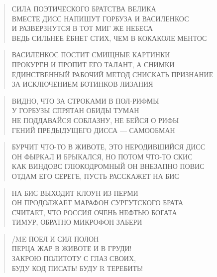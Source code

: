 \poemtitle{***}
\begin{verse}
СИЛА ПОЭТИЧЕСКОГО БРАТСТВА ВЕЛИКА\\
ВМЕСТЕ ДИСС НАПИШУТ ГОРБУЗА И ВАСИЛЕНКОС \\
И РАЗВЕРЗНУТСЯ В ТОТ МИГ ЖЕ НЕБЕСА\\
ВЕДЬ СИЛЬНЕЕ ЁБНЕТ СТИХ, ЧЕМ В КОКАКОЛЕ МЕНТОС
\end{verse}

\poemtitle{***}
\begin{verse}
ВАСИЛЕНКОС ПОСТИТ СМИЩНЫЕ КАРТИНКИ\\
ПРОКУРЕН И ПРОПИТ ЕГО ТАЛАНТ, А СНИМКИ\\
ЕДИНСТВЕННЫЙ РАБОЧИЙ МЕТОД СНИСКАТЬ ПРИЗНАНИЕ\\
ЗА ИСКЛЮЧЕНИЕМ БОТИНКОВ ЛИЗАНИЯ
\end{verse}

\poemtitle{***}
\begin{verse}
ВИДНО, ЧТО ЗА СТРОКАМИ В ПОЛ-РИФМЫ\\
У ГОРБУЗЫ СПРЯТАН ОБИДЫ ТУМАН\\
НЕ ПОДДАВАЙСЯ СОБЛАЗНУ, НЕ БЕЙСЯ О РИФЫ\\
ГЕНИЙ ПРЕДЫДУЩЕГО ДИССА — САМООБМАН
\end{verse}

\poemtitle{***}
\begin{verse}
БУРЧИТ ЧТО-ТО В ЖИВОТЕ, ЭТО НЕРОДИВШИЙСЯ ДИСС\\
ОН ФЫРКАЛ И БРЫКАЛСЯ, НО ПОТОМ ЧТО-ТО СКИС\\
КАК ВИНДОВС ГЛЮКОДРОМНЫЙ ОН ВНЕЗАПНО ПОВИС\\
ОТДАМ ЕГО СЕРЕГЕ, ПУСТЬ РАССКАЖЕТ НА БИС
\end{verse}

\poemtitle{***}
\begin{verse}
НА БИС ВЫХОДИТ КЛОУН ИЗ ПЕРМИ\\
ОН ПРОДОЛЖАЕТ МАРАФОН СУРГУТСКОГО БРАТА\\
СЧИТАЕТ, ЧТО РОССИЯ ОЧЕНЬ НЕФТЬЮ БОГАТА\\
ТИМУР, ОБРАТНО МИКРОФОН ЗАБЕРИ
\end{verse}

\poemtitle{***}
\begin{verse}
/ME ПОЕЛ И СИЛ ПОЛОН\\
ПЕРЦА ЖАР В ЖИВОТЕ И В ГРУДИ!\\
ЗАКРОЮ ПОЛИТОТУ С ГЛАЗ СВОИХ,\\
БУДУ КОД ПИСАТЬ! БУДУ R ТЕРЕБИТЬ!
\end{verse}


